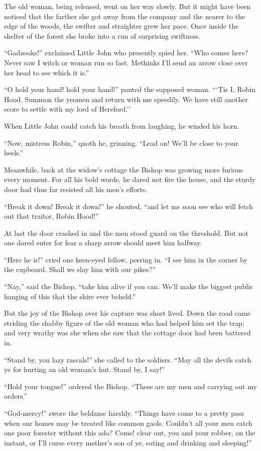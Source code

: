 The old woman, being released, went on her way slowly. But it might have
been noticed that the farther she got away from the company and the
nearer to the edge of the woods, the swifter and straighter grew her
pace. Once inside the shelter of the forest she broke into a run of
surprising swiftness.

``Gadzooks!'' exclaimed Little John who presently spied her. ``Who comes
here? Never saw I witch or woman run so fast. Methinks I'll send an
arrow close over her head to see which it is.''

``O hold your hand! hold your hand!'' panted the supposed woman. ```Tis
I, Robin Hood. Summon the yeomen and return with me speedily. We have
still another score to settle with my lord of Hereford.''

When Little John could catch his breath from laughing, he winded his
horn.

``Now, mistress Robin,'' quoth he, grinning. ``Lead on! We'll be close
to your heels.''

Meanwhile, back at the widow's cottage the Bishop was growing more
furious every moment. For all his bold words, he dared not fire the
house, and the sturdy door had thus far resisted all his men's efforts.

``Break it down! Break it down!'' he shouted, ``and let me soon see who
will fetch out that traitor, Robin Hood!''

At last the door crashed in and the men stood guard on the threshold.
But not one dared enter for fear a sharp arrow should meet him halfway.

``Here he is!'' cried one keen-eyed fellow, peering in. ``I see him in
the corner by the cupboard. Shall we slay him with our pikes?''

``Nay,'' said the Bishop, ``take him alive if you can. We'll make the
biggest public hanging of this that the shire ever beheld.''

But the joy of the Bishop over his capture was short lived. Down the
road came striding the shabby figure of the old woman who had helped him
set the trap; and very wrathy was she when she saw that the cottage door
had been battered in.

``Stand by, you lazy rascals!'' she called to the soldiers. ``May all
the devils catch ye for hurting an old woman's hut. Stand by, I say!''

``Hold your tongue!'' ordered the Bishop. ``These are my men and
carrying out my orders.''

``God-mercy!'' swore the beldame harshly. ``Things have come to a pretty
pass when our homes may be treated like common gaols. Couldn't all your
men catch one poor forester without this ado? Come! clear out, you and
your robber, on the instant, or I'll curse every mother's son of ye,
eating and drinking and sleeping!''

